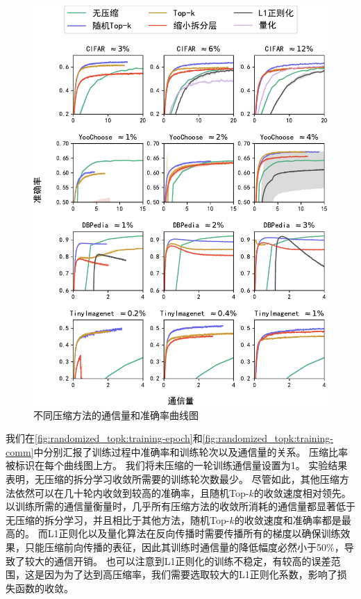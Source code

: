 \begin{figure}[h!]
    \centering
    \includegraphics[width=1\linewidth]{Z_Resources/randtopk_acc-comm}
    \caption{不同压缩方法的通信量和准确率曲线图}
    \label{fig:randomized_topk:training-comm}
\end{figure}


我们在\autoref{fig:randomized_topk:training-epoch}和\autoref{fig:randomized_topk:training-comm}中分别汇报了训练过程中准确率和训练轮次以及通信量的关系。
压缩比率被标识在每个曲线图上方。
%
我们将未压缩的一轮训练通信量设置为1。
%
实验结果表明，无压缩的拆分学习收敛所需要的训练轮次数最少。
尽管如此，其他压缩方法依然可以在几十轮内收敛到较高的准确率，且随机Top-$k$的收敛速度相对领先。
%
以训练所需的通信量衡量时，几乎所有压缩方法的收敛所消耗的通信量都显著低于无压缩的拆分学习，并且相比于其他方法，随机Top-$k$的收敛速度和准确率都是最高的。
%
而L1正则化以及量化算法在反向传播时需要传播所有的梯度以确保训练效果，只能压缩前向传播的表征，因此其训练时通信量的降低幅度必然小于50\%，导致了较大的通信开销。
%
也可以注意到L1正则化的训练不稳定，有较高的误差范围，这是因为为了达到高压缩率，我们需要选取较大的L1正则化系数，影响了损失函数的收敛。
%

